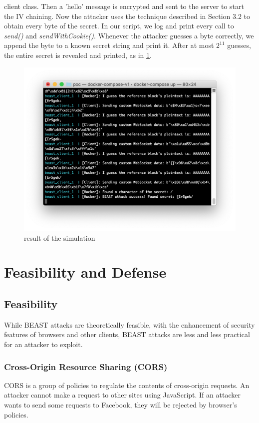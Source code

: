 \documentclass{acm_proc_article-sp}
\begin{document}
client class.
Then a 'hello' message is encrypted and sent to the server to start the IV chaining.
Now the attacker uses the technique described in Section 3.2 to obtain every byte of the secret.
In our script, we log and print every call to \textit{send()} and \textit{sendWithCookie()}.
Whenever the attacker guesses a byte correctly, we append the byte to a known secret string and
print it. After at most $2^{11}$ guesses, the entire secret is revealed and printed, as in \ref{fig:simulation}.
\begin{figure}[htb]
    \centering
    \includegraphics[keepaspectratio, width=\linewidth]{./figures/simulation.png}
    \caption{result of the simulation}
    \label{fig:simulation}
\end{figure}

\section{Feasibility and Defense}
\subsection{Feasibility}
While BEAST attacks are theoretically feasible, with the enhancement of security
features of browsers and other clients, BEAST attacks are less and less practical
for an attacker to exploit.

\subsubsection{Cross-Origin Resource Sharing (CORS)}
CORS is a group of policies to regulate the contents of cross-origin requests.
An attacker cannot make a request to other sites using JavaScript. If an attacker
wants to send some requests to Facebook, they will be rejected by browser's policies.
\end{document}
